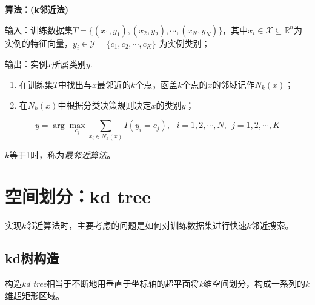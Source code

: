 \begin{framed}
    \textbf{算法：(k邻近法)}

    输入：训练数据集$T=\{(x_1,y_1),(x_2,y_2),\cdots,(x_N,y_N)\}$，其中$x_i\in \mathcal{X}\subseteq \mathbb{R}^n$为实例的特征向量，$y_i\in \mathcal{Y}=\{c_1,c_2,\cdots,c_K\}$
    为实例类别；

    输出：实例$x$所属类别$y$.

    \begin{enumerate}[itemindent=2em]
        \item 在训练集$T$中找出与$x$最邻近的$k$个点，函盖$k$个点的$x$的邻域记作$N_k(x)$；
        \item 在$N_k(x)$中根据分类决策规则决定$x$的类别$y$；
    \end{enumerate}
    \begin{equation}
        y=\arg\max\limits_{c_j}\sum_{x_i\in N_k(x)} I(y_i=c_j),\ \ \ i=1,2,\cdots,N,\ \ j=1,2,\cdots,K
    \end{equation}
\end{framed}

$k$等于1时，称为\textsl{最邻近算法}。

\section{空间划分：kd tree}

实现$k$邻近算法时，主要考虑的问题是如何对训练数据集进行快速$k$邻近搜索。

\subsection*{kd树构造}

构造\textsl{kd tree}相当于不断地用垂直于坐标轴的超平面将$k$维空间划分，构成一系列的$k$维超矩形区域。

